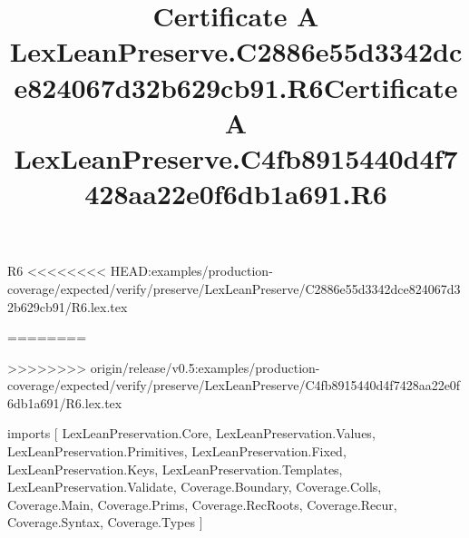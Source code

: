 \begin{lexlean}{R6}
<<<<<<<< HEAD:examples/production-coverage/expected/verify/preserve/LexLeanPreserve/C2886e55d3342dce824067d32b629cb91/R6.lex.tex
\title{Certificate A LexLeanPreserve.C2886e55d3342dce824067d32b629cb91.R6}
========
\title{Certificate A LexLeanPreserve.C4fb8915440d4f7428aa22e0f6db1a691.R6}
>>>>>>>> origin/release/v0.5:examples/production-coverage/expected/verify/preserve/LexLeanPreserve/C4fb8915440d4f7428aa22e0f6db1a691/R6.lex.tex
\begin{coremodule}
imports [
  LexLeanPreservation.Core,
  LexLeanPreservation.Values,
  LexLeanPreservation.Primitives,
  LexLeanPreservation.Fixed,
  LexLeanPreservation.Keys,
  LexLeanPreservation.Templates,
  LexLeanPreservation.Validate,
  Coverage.Boundary,
  Coverage.Colls,
  Coverage.Main,
  Coverage.Prims,
  Coverage.RecRoots,
  Coverage.Recur,
  Coverage.Syntax,
  Coverage.Types
]


\end{coremodule}
\end{lexlean}
